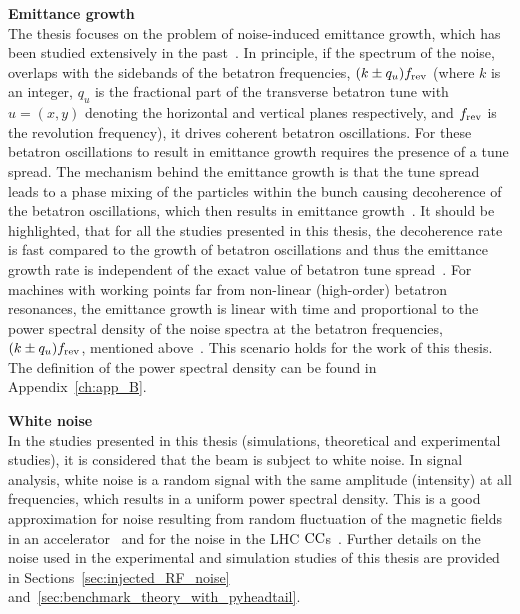 \textbf{Emittance growth}\\
The thesis focuses on the problem of noise-induced emittance growth, which has been studied extensively in the past~\cite{Lebedev:248620, Lebedev:248622, PhysRevSTAB.18.101001}. In principle, if the spectrum of the noise, overlaps with the sidebands of the betatron frequencies, $(k \pm q_u) {f_\mathrm{rev}}$ (where $k$ is an integer, $q_u$ is the fractional part of the transverse betatron tune with $u=(x,y)$ denoting the horizontal and vertical planes respectively, and ${f_\mathrm{rev}}$ is the revolution frequency), it drives coherent betatron oscillations. For these betatron oscillations to result in emittance growth requires the presence of a tune spread. The mechanism behind the emittance growth is that the tune spread leads to a phase mixing of the particles within the bunch causing decoherence of the betatron oscillations, which then results in emittance growth~\cite{Lebedev:248620}. It should be highlighted, that for all the studies presented in this thesis, the decoherence rate is fast compared to the growth of betatron oscillations and thus the emittance growth rate is independent of the exact value of betatron tune spread~\cite{Lebedev:248620}. For machines with working points far from non-linear (high-order) betatron resonances, the emittance growth is linear with time and proportional to the power spectral density of the noise spectra at the betatron frequencies, $(k \pm q_u) {f_\mathrm{rev}}$, mentioned above~\cite{Lebedev:248620}. This scenario holds for the work of this thesis. The definition of the power spectral density can be found in Appendix~\ref{ch:app_B}. 



\textbf{White noise}\\
In the studies presented in this thesis (simulations, theoretical and experimental studies), it is considered that the beam is subject to white noise. In signal analysis, white noise is a random signal with the same amplitude (intensity) at all frequencies, which results in a uniform power spectral density. This is a good approximation for noise resulting from random fluctuation of the magnetic fields in an accelerator~\cite{Lebedev:248620} and for the noise in the LHC ${\mathrm{CC}}$s~\cite{PhysRevSTAB.18.101001}. Further details on the noise used in the experimental and simulation studies of this thesis are provided in Sections~\ref{sec:injected_RF_noise} and~\ref{sec:benchmark_theory_with_pyheadtail}.

